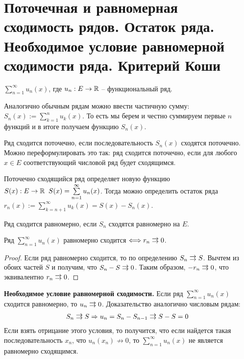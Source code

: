 \section{Поточечная и равномерная сходимость рядов. Остаток ряда. Необходимое условие равномерной сходимости ряда. Критерий Коши}
\begin{conj}
    $\sum\limits_{n = 1}^\infty u_n(x)$, где $u_n: E \to \mathbb{R}$ -- функциональный ряд.    
\end{conj} 
Аналогично обычным рядам можно ввести частичную сумму: $S_n(x) := \sum\limits_{k = 1}^n u_k(x)$.
То есть мы берем и честно суммируем первые $n$ функций и в итоге получаем функцию $S_n(x)$.
\begin{conj}
    Ряд сходится поточечно, если последовательность $S_n(x)$ сходятся поточечно.
    Можно переформулировать это так: ряд сходится поточечно, если для любого $x \in E$ соответствующий числовой ряд будет сходящимся.

    Поточечно сходящийся ряд определяет новую функцию $S(x): E \to \mathbb{R} \;\; S(x) = \sum\limits_{n = 1}^\infty u_n(x)$.
    Тогда можно определить остаток ряда $r_n(x) := \sum\limits_{k = n + 1}^\infty u_k(x) = S(x) - S_n(x)$.
\end{conj}

\vspace*{5mm}

\begin{conj}
    Ряд сходится равномерно, если $S_n$ сходятся равномерно на $E$.
\end{conj}

\begin{theorem}
    Ряд $\sum\limits_{n = 1}^\infty u_n(x)$ равномерно сходится $\Longleftrightarrow r_n \doublerightarrow 0$. 
\end{theorem}
\begin{proof}
    Если ряд равномерно сходится, то по определению $S_n \doublerightarrow S$.
    Вычтем из обоих частей $S$ и получим, что $S_n - S \doublerightarrow 0$.
    Таким образом, $-r_n \doublerightarrow 0$, что эквивалентно $r_n \doublerightarrow 0$.
\end{proof}

\vspace*{5mm}

\textbf{Необходимое условие равномерной сходимости.} Если ряд $\sum\limits_{n = 1}^\infty u_n(x)$ сходится равномерно, то $u_n \doublerightarrow 0$.
Доказательство аналогично числовым рядам: 
\begin{gather*}
    S_n \doublerightarrow S \Rightarrow u_n = S_n - S_{n-1} \doublerightarrow S - S = 0
\end{gather*}
Если взять отрицание этого условия, то получится, что если найдется такая последовательность $x_n$, что $u_n(x_n) \nrightarrow 0$, то $\sum\limits_{n = 1}^\infty u_n(x)$ не является равномерно сходящимся.
    
